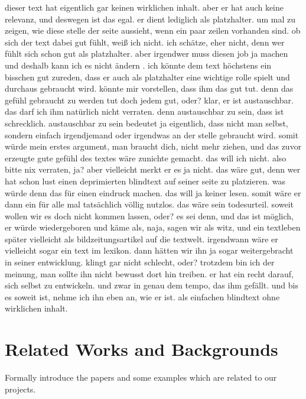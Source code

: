 \documentclass[conference]{IEEEtran}
\begin{document}
dieser text hat eigentlich gar keinen wirklichen inhalt. aber er hat auch keine relevanz, und deswegen ist das egal. er dient lediglich als platzhalter. um mal zu zeigen, wie diese stelle der seite aussieht, wenn ein paar zeilen vorhanden sind. ob sich der text dabei gut fühlt, weiß ich nicht. ich schätze, eher nicht, denn wer fühlt sich schon gut als platzhalter. aber irgendwer muss diesen job ja machen und deshalb kann ich es nicht ändern . ich könnte dem text höchstens ein bisschen gut zureden, dass er auch als platzhalter eine wichtige rolle spielt und durchaus gebraucht wird. könnte mir vorstellen, dass ihm das gut tut. denn das gefühl gebraucht zu werden tut doch jedem gut, oder? klar, er ist austauschbar. das darf ich ihm natürlich nicht verraten. denn austauschbar zu sein, dass ist schrecklich. austauschbar zu sein bedeutet ja eigentlich, dass nicht man selbst, sondern einfach irgendjemand oder irgendwas an der stelle gebraucht wird. somit würde mein erstes argument, man braucht dich, nicht mehr ziehen, und das zuvor erzeugte gute gefühl des textes wäre zunichte gemacht. das will ich nicht. also bitte nix verraten, ja? aber vielleicht merkt er es ja nicht. das wäre gut, denn wer hat schon lust einen deprimierten blindtext auf seiner seite zu platzieren. was würde denn das für einen eindruck machen. das will ja keiner lesen. somit wäre er dann ein für alle mal tatsächlich völlig nutzlos. das wäre sein todesurteil. soweit wollen wir es doch nicht kommen lassen, oder? es sei denn, und das ist möglich, er würde wiedergeboren und käme als, naja, sagen wir als witz, und ein textleben später vielleicht als bildzeitungsartikel auf die textwelt. irgendwann wäre er vielleicht sogar ein text im lexikon. dann hätten wir ihn ja sogar weitergebracht in seiner entwicklung. klingt gar nicht schlecht, oder? trotzdem bin ich der meinung, man sollte ihn nicht bewusst dort hin treiben. er hat ein recht darauf, sich selbst zu entwickeln. und zwar in genau dem tempo, das ihm gefällt. und bis es soweit ist, nehme ich ihn eben an, wie er ist. als einfachen blindtext ohne wirklichen inhalt.

\section{Related Works and Backgrounds}
Formally introduce the papers and some examples which are related to our projects.
\end{document}
